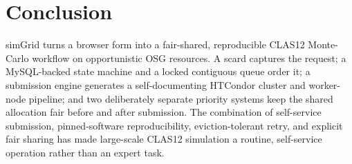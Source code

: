 \section{Conclusion}\label{ch:18}

simGrid turns a browser form into a fair-shared, reproducible CLAS12 Monte-Carlo workflow on opportunistic OSG
resources. A scard captures the request; a MySQL-backed state machine and a locked contiguous queue order it; a
submission engine generates a self-documenting HTCondor cluster and worker-node pipeline; and two deliberately
separate priority systems keep the shared allocation fair before and after submission. The combination of
self-service submission, pinned-software reproducibility, eviction-tolerant retry, and explicit fair sharing
has made large-scale CLAS12 simulation a routine, self-service operation rather than an expert task.
